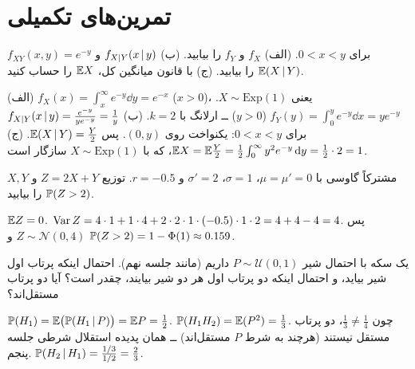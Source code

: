 \section{تمرین‌های تکمیلی}

\begin{exercise}
$f_{XY}(x,y)=e^{-y}$ برای $0<x<y$. (الف) $f_X$ و $f_Y$ را بیابید. (ب) $f_{X|Y}(x\,|\, y)$ و $\mathbb{E}(X\,|\, Y)$ را بیابید. (ج) با قانون میانگین کل، $\mathbb{E} X$ را حساب کنید.
\end{exercise}
\begin{solution}
(الف) $f_X(x)=\int_x^\infty e^{-y}\dd y=e^{-x}$ ($x>0$)، یعنی $X\sim\mathrm{Exp}(1)$. $f_Y(y)=\int_0^ye^{-y}\dd x=ye^{-y}$ ($y>0$) ــ ارلانگ با $k=2$.
(ب) $f_{X|Y}(x\,|\, y)=\frac{e^{-y}}{ye^{-y}}=\frac1y$ برای $0<x<y$: یکنواخت روی $(0,y)$. پس $\mathbb{E}(X\,|\, Y)=\frac Y2$.
(ج) $\mathbb{E} X=\mathbb{E}\frac Y2=\frac12\int_0^\infty y^2e^{-y}\,\mathrm{d} y=\frac12\cdot2=1$، که با $X\sim\mathrm{Exp}(1)$ سازگار است.
\end{solution}

\begin{exercise}
$X,Y$ مشترکاً گاوسی با $\mu=\mu'=0$، $\sigma=1$، $\sigma'=2$ و $r=-0.5$. توزیع $Z=2X+Y$ و $\mathbb{P}(Z>2)$ را بیابید.
\end{exercise}
\begin{solution}
$\mathbb{E} Z=0$. $\operatorname{Var} Z=4\cdot1+1\cdot4+2\cdot2\cdot1\cdot(-0.5)\cdot1\cdot2=4+4-4=4$. پس $Z\sim\mathcal N(0,4)$ و $\mathbb{P}(Z>2)=1-\Phi(1)\approx0.159$.
\end{solution}

\begin{exercise}
یک سکه با احتمال شیر $P\sim\mathcal U(0,1)$ داریم (مانند جلسه نهم). احتمال اینکه پرتاب اول شیر بیاید، و احتمال اینکه دو پرتاب اول هر دو شیر بیایند، چقدر است؟ آیا دو پرتاب مستقل‌اند؟
\end{exercise}
\begin{solution}
$\mathbb{P}(H_1)=\mathbb{E}\big(\mathbb{P}(H_1\,|\, P)\big)=\mathbb{E} P=\frac12$. $\mathbb{P}(H_1H_2)=\mathbb{E}(P^2)=\frac13$. چون $\frac13\ne\frac14$، دو پرتاب مستقل نیستند (هرچند به شرط $P$ مستقل‌اند) ــ همان پدیده استقلال شرطی جلسه پنجم. $\mathbb{P}(H_2\,|\, H_1)=\frac{1/3}{1/2}=\frac23$.
\end{solution}

